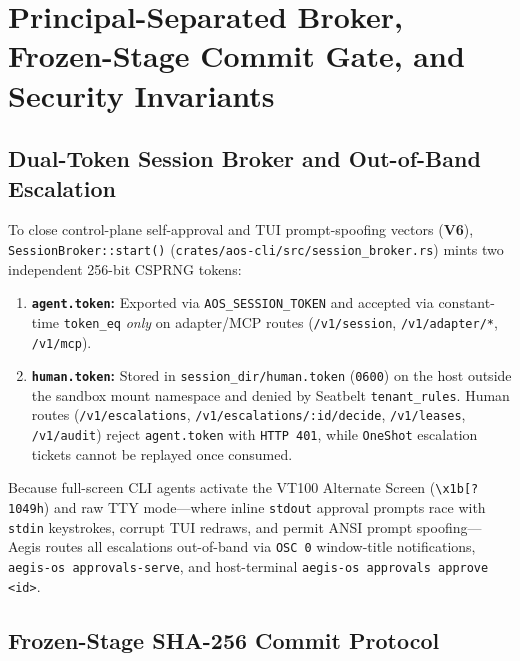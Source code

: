 \documentclass[10pt,twocolumn]{article}
\begin{document}
\section{Principal-Separated Broker, Frozen-Stage Commit Gate, and Security Invariants}
\label{sec:commit}

\subsection{Dual-Token Session Broker and Out-of-Band Escalation}

To close control-plane self-approval and TUI prompt-spoofing vectors (\textbf{V6}), \texttt{SessionBroker::start()} (\texttt{crates/aos-cli/src/session\_broker.rs}) mints two independent 256-bit CSPRNG tokens:
\begin{enumerate}
    \item \textbf{\texttt{agent.token}:} Exported via \texttt{AOS\_SESSION\_TOKEN} and accepted via constant-time \texttt{token\_eq} \emph{only} on adapter/MCP routes (\texttt{/v1/session}, \texttt{/v1/adapter/*}, \texttt{/v1/mcp}).
    \item \textbf{\texttt{human.token}:} Stored in \texttt{session\_dir/\allowbreak human.token} (\texttt{0600}) on the host outside the sandbox mount namespace and denied by Seatbelt \texttt{tenant\_rules}. Human routes (\texttt{/v1/escalations}, \texttt{/v1/\allowbreak escalations/\allowbreak :id/\allowbreak decide}, \texttt{/v1/leases}, \texttt{/v1/audit}) reject \texttt{agent.token} with \texttt{HTTP 401}, while \texttt{OneShot} escalation tickets cannot be replayed once consumed.
\end{enumerate}

Because full-screen CLI agents activate the VT100 Alternate Screen (\texttt{\textbackslash x1b[?1049h}) and raw TTY mode---where inline \texttt{stdout} approval prompts race with \texttt{stdin} keystrokes, corrupt TUI redraws, and permit ANSI prompt spoofing---Aegis routes all escalations out-of-band via \texttt{OSC 0} window-title notifications, \texttt{aegis-os approvals-serve}, and host-terminal \texttt{aegis-os approvals approve <id>}.

\subsection{Frozen-Stage SHA-256 Commit Protocol}
\end{document}
